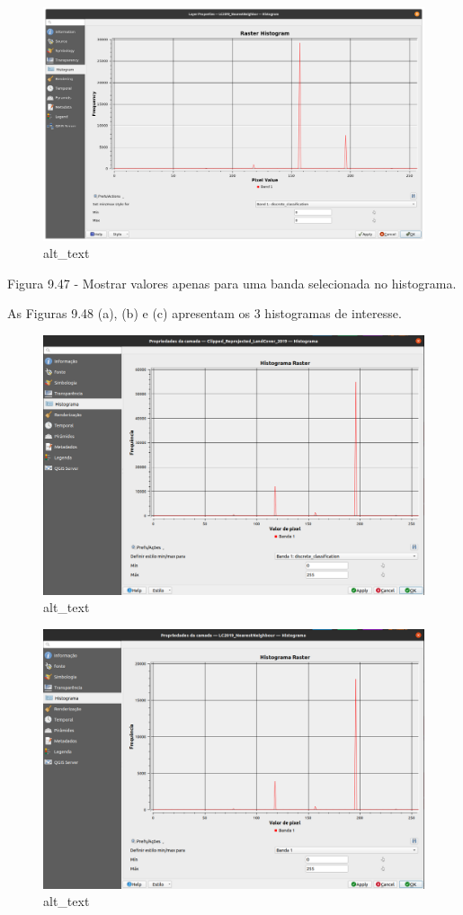 \documentclass[
]{book}
\begin{document}
\begin{figure}
\centering
\includegraphics{media/modulo9/fig947.png}
\caption{alt\_text}
\end{figure}

Figura 9.47 - Mostrar valores apenas para uma banda selecionada no histograma.

As Figuras 9.48 (a), (b) e (c) apresentam os 3 histogramas de interesse.

\begin{figure}
\centering
\includegraphics{media/modulo9/fig948_a.png}
\caption{alt\_text}
\end{figure}

\begin{figure}
\centering
\includegraphics{media/modulo9/fig948_b.png}
\caption{alt\_text}
\end{figure}
\end{document}

